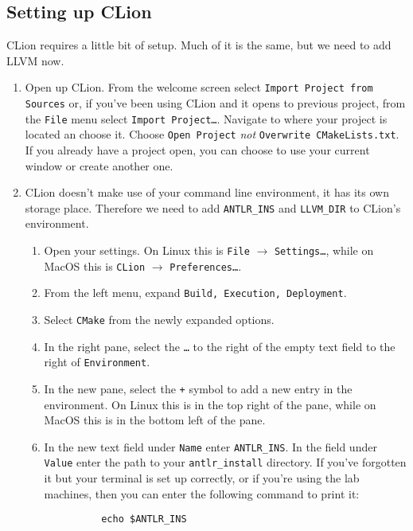 \documentclass{article}
\newcommand{\code}[1]{\texttt{\textmd{#1}}}
\begin{document}
\subsection{Setting up CLion}
CLion requires a little bit of setup. Much of it is the same, but we need to add LLVM now.
\begin{enumerate}
  \item
    Open up CLion. From the welcome screen select \texttt{Import Project from Sources} or, if
    you've been using CLion and it opens to previous project, from the \texttt{File} menu select
    \texttt{Import Project\ldots}. Navigate to where your project is located an choose it. Choose
    \texttt{Open Project} \textit{not} \texttt{Overwrite CMakeLists.txt}. If you already have a
    project open, you can choose to use your current window or create another one.
  \item
    CLion doesn't make use of your command line environment, it has its own storage place.
    Therefore we need to add \code{ANTLR\_INS} and \code{LLVM\_DIR} to CLion's environment.
    \begin{enumerate}
      \item
        Open your settings. On Linux this is \texttt{File} $\rightarrow$ \texttt{Settings\ldots},
        while on MacOS this is \texttt{CLion} $\rightarrow$ \texttt{Preferences\ldots}.
      \item
        From the left menu, expand \texttt{Build, Execution, Deployment}.
      \item
        Select \texttt{CMake} from the newly expanded options.
      \item
        In the right pane, select the \texttt{\ldots} to the right of the empty text field to the
        right of \texttt{Environment}.
      \item
        In the new pane, select the \texttt{+} symbol to add a new entry in the environment. On
        Linux this is in the top right of the pane, while on MacOS this is in the bottom left of
        the pane.
      \item
        In the new text field under \texttt{Name} enter \code{ANTLR\_INS}. In the field under
        \texttt{Value} enter the path to your \code{antlr\_install} directory. If you've forgotten
        it but your terminal is set up correctly, or if you're using the lab machines, then you can
        enter the following command to print it:
        \begin{lstlisting}
          echo $ANTLR_INS
        \end{lstlisting}

\end{enumerate}
\end{enumerate}
\end{document}
